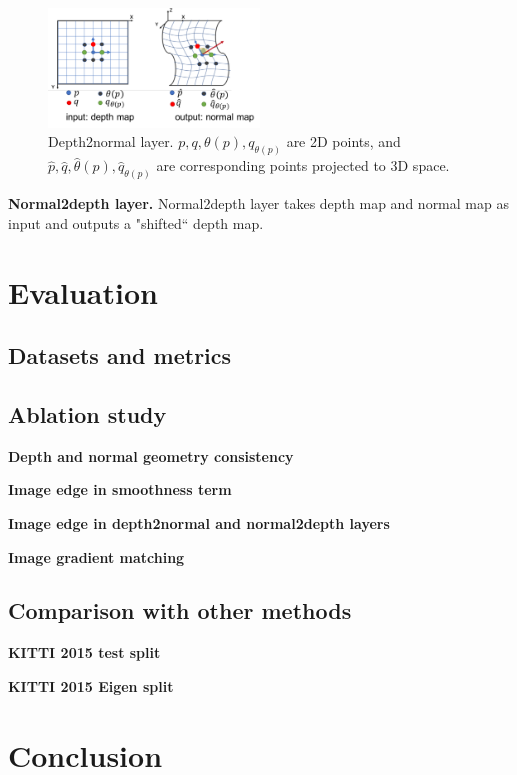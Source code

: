 \documentclass[letterpaper]{article} %
\begin{document}
\begin{figure}
\centering
\includegraphics[width=0.5\textwidth]{figures/d2n.pdf}
\caption{Depth2normal layer. $p, q, \theta(p), q_{\theta(p)}$ are 2D points, and $\hat{p}, \hat{q}, \hat{\theta}(p), \hat{q}_{\theta(p)}$ are corresponding points projected to 3D space.}
\label{fig:d2n}
\end{figure}

\textbf{Normal2depth layer.} Normal2depth layer takes depth map and normal map as input and outputs a "shifted`` depth map.

\section{Evaluation}

\subsection{Datasets and metrics}

\subsection{Ablation study}

\textbf{Depth and normal geometry consistency}

\textbf{Image edge in smoothness term}

\textbf{Image edge in depth2normal and normal2depth layers}

\textbf{Image gradient matching}

\subsection{Comparison with other methods}

\textbf{KITTI 2015 test split}

\textbf{KITTI 2015 Eigen split}

\section{Conclusion}



\end{document}
